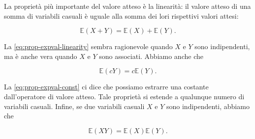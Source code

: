 \documentclass[
  11pt,
]{krantz}
\newcommand{\E}{\mathbb{E}} %
\theoremstyle{definition}
\theoremstyle{definition}
\theoremstyle{definition}
\theoremstyle{definition}
\theoremstyle{remark}
\begin{document}
La proprietà più importante del valore atteso è la linearità: il valore atteso di una somma di variabili casuali è uguale alla somma dei lori rispettivi valori attesi:

\begin{equation}
\E(X + Y) = \E(X) + \E(Y).
\label{eq:prop-expval-linearity}
\end{equation}

La \eqref{eq:prop-expval-linearity} sembra ragionevole quando \(X\) e \(Y\) sono indipendenti, ma è anche vera quando \(X\) e \(Y\) sono associati. Abbiamo anche che

\begin{equation}
\E(cY) = c \E(Y).
\label{eq:prop-expval-const}
\end{equation}

La \eqref{eq:prop-expval-const} ci dice che possiamo estrarre una costante dall'operatore di valore atteso. Tale proprietà si estende a qualunque numero di variabili casuali. Infine, se due variabili casuali \(X\) e \(Y\) sono indipendenti, abbiamo che

\begin{equation}
\E(X Y) = \E(X) \E(Y). 
\label{eq:expval-prod-ind-rv}
\end{equation}
\end{document}
